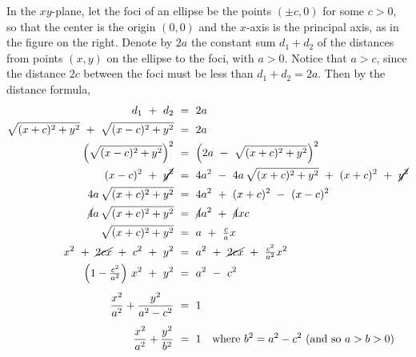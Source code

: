In the $xy$-plane, let the foci of an ellipse be the points $(\pm c,0)$ for some
$c>0$, so that the center is the origin $(0,0)$ and the $x$-axis is the
principal axis, as in the figure on the right. Denote by $2a$ the constant sum
$d_1+d_2$ of the distances from points $(x,y)$ on the ellipse to the foci, with
$a > 0$. Notice that $a>c$, since the distance $2c$ between the foci must be
less than $d_1+d_2 = 2a$. Then by the distance formula,
\begin{align*}
d_1 ~+~ d_2 ~&=~ 2a\\
\sqrt{(x+c)^2 + y^2} ~+~ \sqrt{(x-c)^2 + y^2} ~&=~ 2a\\
\left(\sqrt{(x-c)^2 + y^2}\right)^2 ~&=~ \left(2a ~-~ \sqrt{(x+c)^2 + y^2}\right)^2\\
(x-c)^2 ~+~ \cancel{y^2} ~&=~ 4a^2 ~-~ 4a\,\sqrt{(x+c)^2 + y^2} ~+~ (x+c)^2 ~+~ \cancel{y^2}\\
4a\,\sqrt{(x+c)^2 + y^2} ~&=~ 4a^2 ~+~ (x+c)^2 ~-~ (x-c)^2\\
\cancel{4}a\,\sqrt{(x+c)^2 + y^2} ~&=~ \cancel{4}a^2 ~+~ \cancel{4}xc\\
\sqrt{(x+c)^2 + y^2} ~&=~ a ~+~ \tfrac{c}{a}x\\
x^2 ~+~ \cancel{2cx} ~+~ c^2 ~+~ y^2 ~&=~ a^2 ~+~ \cancel{2cx} ~+~ \tfrac{c^2}{a^2}x^2\\
\left(1 - \tfrac{c^2}{a^2}\right)\,x^2 ~+~ y^2 ~&=~ a^2 ~-~ c^2\\[4pt]
\frac{x^2}{a^2} + \frac{y^2}{a^2 - c^2} ~&=~ 1\\[4pt]
\frac{x^2}{a^2} + \frac{y^2}{b^2} ~&=~ 1
\quad\text{where $b^2 = a^2 - c^2$ (and so $a > b > 0$)}\quad\checkmark
\end{align*}
\newpage
